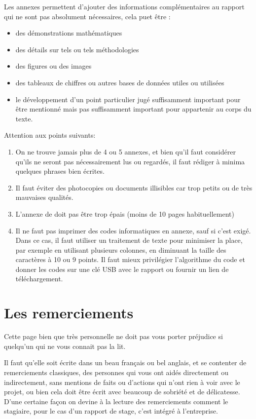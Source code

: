 Les annexes permettent d'ajouter des informations complémentaires au rapport qui ne sont pas absolument nécessaires, cela puet être :
\begin{itemize}
\item des démonstrations mathématiques
\item des détails sur tels ou tels méthodologies
\item des figures ou des images
\item des tableaux de chiffres ou autres bases de données utiles ou utilisées
\item le développement d'un point particulier jugé suffisamment important pour être mentionné mais pas suffisamment important pour appartenir au corps du texte.
\end{itemize}


Attention aux points suivants:
\begin{enumerate}
	\item On ne trouve jamais plus de 4 ou 5 annexes, et bien qu'il faut considérer qu'ils ne seront pas nécessairement lus ou regardés, 
	il faut rédiger à minima  quelques phrases bien écrites. 

	\item Il faut éviter des photocopies ou documents illisibles car trop petits ou de très mauvaises qualités. 

 	\item L'annexe de doit pas être trop épais (moins de 10 pages habituellement)
 	
 	\item Il ne faut pas imprimer des codes informatiques en annexe, sauf si c'est exigé. Dans ce cas, il faut utiliser un traitement de texte pour minimiser la place,
 	par exemple en utilisant plusieurs colonnes, en diminuant la taille des caractères à 10 ou 9 points. Il faut mieux privilégier l'algorithme du code 
 	       et donner les codes sur une  clé USB avec le rapport ou fournir un lien de téléchargement.
\end{enumerate}


\section{Les remerciements}

Cette page bien que très personnelle ne doit pas vous porter préjudice si quelqu'un qui ne vous connait pas la lit.

Il faut qu'elle soit écrite dans un beau français ou bel anglais, et se contenter de remerciements classiques, des personnes qui vous ont aidés
directement ou indirectement, sans mentions de faits
ou d'actions qui n'ont rien à voir avec le projet, ou bien cela doit être écrit avec beaucoup de sobriété et de délicatesse.
D'une certaine façon on devine à la lecture des remerciements comment le stagiaire, pour le cas d'un rapport de stage, c'est intégré à l'entreprise.


